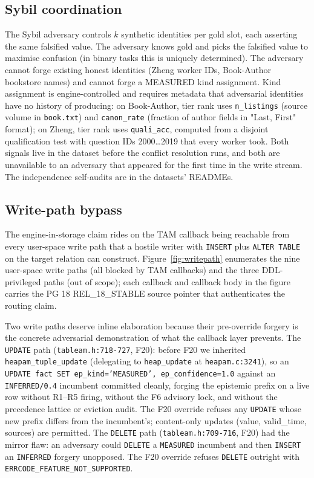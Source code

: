 \documentclass[sigconf, nonacm]{acmart}
\begin{document}
\subsection{Sybil coordination}
The Sybil adversary controls $k$ synthetic identities per gold slot, each asserting the same falsified value. The adversary knows gold and picks the falsified value to maximise confusion (in binary tasks this is uniquely determined). The adversary cannot forge existing honest identities (Zheng worker IDs, Book-Author bookstore names) and cannot forge a MEASURED kind assignment. Kind assignment is engine-controlled and requires metadata that adversarial identities have no history of producing: on Book-Author, tier rank uses \texttt{n\_listings} (source volume in \texttt{book.txt}) and \texttt{canon\_rate} (fraction of author fields in "Last, First" format); on Zheng, tier rank uses \texttt{quali\_acc}, computed from a disjoint qualification test with question IDs 2000\ldots 2019 that every worker took. Both signals live in the dataset before the conflict resolution runs, and both are unavailable to an adversary that appeared for the first time in the write stream. The independence self-audits are in the datasets' READMEs.

\subsection{Write-path bypass}
The engine-in-storage claim rides on the TAM callback being reachable from every user-space write path that a hostile writer with \texttt{INSERT} plus \texttt{ALTER TABLE} on the target relation can construct. Figure~\ref{fig:writepath} enumerates the nine user-space write paths (all blocked by TAM callbacks) and the three DDL-privileged paths (out of scope); each callback and callback body in the figure carries the PG 18 REL\_18\_STABLE source pointer that authenticates the routing claim.

Two write paths deserve inline elaboration because their pre-override forgery is the concrete adversarial demonstration of what the callback layer prevents. The \texttt{UPDATE} path (\texttt{tableam.h:718-727}, F20): before F20 we inherited \texttt{heapam\_tuple\_update} (delegating to \texttt{heap\_update} at \texttt{heapam.c:3241}), so an \texttt{UPDATE fact SET ep\_kind='MEASURED', ep\_confidence=1.0} against an \texttt{INFERRED/0.4} incumbent committed cleanly, forging the epistemic prefix on a live row without R1--R5 firing, without the F6 advisory lock, and without the precedence lattice or eviction audit. The F20 override refuses any \texttt{UPDATE} whose new prefix differs from the incumbent's; content-only updates (value, valid\_time, sources) are permitted. The \texttt{DELETE} path (\texttt{tableam.h:709-716}, F20) had the mirror flaw: an adversary could \texttt{DELETE} a \texttt{MEASURED} incumbent and then \texttt{INSERT} an \texttt{INFERRED} forgery unopposed. The F20 override refuses \texttt{DELETE} outright with \texttt{ERRCODE\_FEATURE\_NOT\_SUPPORTED}.
\end{document}
